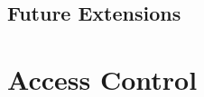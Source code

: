 \documentclass{sig-alternate}
\begin{document}
\subsection{Future Extensions}



\section{Access Control}
\label{sec:ac}
\end{document}
